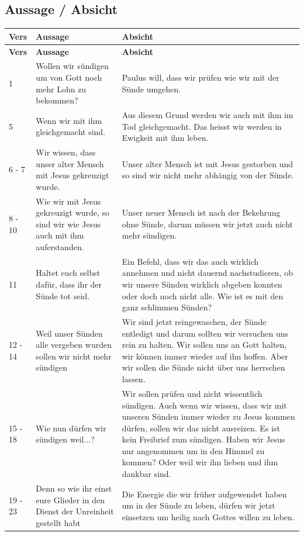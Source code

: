 \subsection{Aussage / Absicht}
\begin{longtable}{l p{6cm} p{7cm}}
    \hline
    \textbf{Vers} &	\textbf{Aussage} & \textbf{Absicht} \\
    \hline
    \endfirsthead
    \hline
    \textbf{Vers} &	\textbf{Aussage} & \textbf{Absicht} \\
    \hline
    \endhead
    1 
    & 
    Wollen wir sündigen um von Gott noch mehr Lohn zu bekommen? 
    & 
    Paulus will, dass wir prüfen wie wir mit der Sünde umgehen. 
    \\
    \hline
    5 
    &
    Wenn wir mit ihm gleichgemacht sind. 
    &
    Aus diesem Grund werden wir auch  mit ihm im Tod gleichgemacht. Das heisst wir werden in Ewigkeit mit ihm leben.
    \\ 
    \hline
    6 - 7
    &
    Wir wissen, dass unser alter Mensch mit Jesus gekreuzigt wurde. 
    &
    Unser alter Mensch ist mit Jesus gestorben und so sind wir nicht mehr abhängig von der Sünde.
    \\ 
    \hline
    8 - 10
    &
    Wie wir mit Jesus gekreuzigt wurde, so sind wir wie Jesus auch mit ihm auferstanden.
    &
    Unser neuer Mensch ist nach der Bekehrung ohne Sünde, darum müssen wir jetzt auch nicht mehr sündigen.
    \\ 
    \hline
    11
    &
    Haltet euch selbst dafür, dass ihr der Sünde tot seid.
    &
    Ein Befehl, dass wir das auch wirklich annehmen und nicht dauernd nachstudieren, ob wir unsere Sünden wirklich abgeben konnten oder doch noch nicht alle. Wie ist es mit den ganz schlimmen Sünden? 
    \\ 
    \hline
    12 - 14
    &
    Weil unser Sünden alle vergeben wurden sollen wir nicht mehr sündigen
    &
    Wir sind jetzt reingewaschen, der Sünde entledigt und darum sollten wir versuchen uns rein zu halten. Wir sollen uns an Gott halten, wir können immer wieder auf ihn hoffen. Aber wir sollen die Sünde nicht über uns herrschen lassen.
    \\ 
    \hline
    15 - 18
    &
    Wie nun dürfen wir sündigen weil...?
    &
    Wir sollen prüfen und nicht wissentlich sündigen. Auch wenn wir wissen, dass wir mit unseren Sünden immer wieder zu Jesus kommen dürfen, sollen wir das nicht ausreizen. Es ist kein Freibrief zum sündigen. Haben wir Jesus nur angenommen um in den Himmel zu kommen? Oder weil wir ihn lieben und ihm dankbar sind.
    \\ 
    \hline
    19 - 23
    &
    Denn so wie ihr einst eure Glieder in den Dienst der Unreinheit gestellt habt
    &
    Die Energie die wir früher aufgewendet haben um in der Sünde zu leben, dürfen wir jetzt einsetzen um heilig nach Gottes willen zu leben.
    \\ 
    \hline   
\end{longtable}